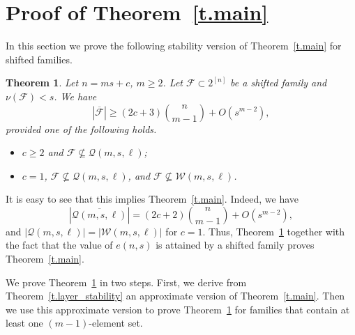 \documentclass[12pt,a4paper]{article}
\newtheorem{theorem}{Theorem}
\begin{document}
\section{Proof of Theorem~\ref{t.main}} \label{s.no_m-1}

In this section we prove the following stability version of Theorem~\ref{t.main} for shifted families.

\begin{theorem} \label{t.main_stability}
    Let $n = ms + c$, $m \geq 2$. Let $\mathcal{F} \subset 2^{[n]}$ be a shifted family and $\nu(\mathcal{F}) < s$. We have   \[
    |\overline{\mathcal{F}}| \geq (2c+3){n \choose m - 1} + O(s^{m - 2}),
    \] 
    provided one of the following holds.
    \begin{itemize}
        \item $c \geq 2$ and $\mathcal{F} \nsubseteq \mathcal{Q}(m, s, \ell)$;
        \item $c = 1$, $\mathcal{F} \nsubseteq \mathcal{Q}(m, s, \ell)$, and $\mathcal{F} \nsubseteq \mathcal{W}(m, s, \ell)$.
    \end{itemize}
\end{theorem}

It is easy to see that this implies  Theorem~\ref{t.main}. Indeed, we have
\[
|\overline{\mathcal{Q}(m, s, \ell)}| = (2c+2){n \choose m - 1} + O(s^{m-2}),
\]
and $|\mathcal{Q}(m, s, \ell)| = |\mathcal{W}(m, s, \ell)|$ for $c=1$. Thus, Theorem~\ref{t.main_stability} together with the fact that the value of $e(n, s)$ is attained by a shifted family proves Theorem~\ref{t.main}.



We prove Theorem~\ref{t.main_stability} in two steps. First, we derive from Theorem~\ref{t.layer_stability} an approximate version of Theorem~\ref{t.main}. Then we use this approximate version to prove Theorem~\ref{t.main_stability} for families that contain at least one $(m-1)$-element set.
\end{document}
